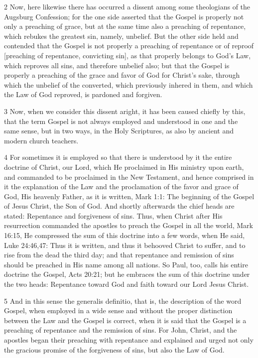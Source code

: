 2 Now, here likewise there has occurred a dissent among some theologians of the Augsburg Confession; for the one side asserted that the Gospel is properly not only a preaching of grace, but at the same time also a preaching of repentance, which rebukes the greatest sin, namely, unbelief. But the other side held and contended that the Gospel is not properly a preaching of repentance or of reproof [preaching of repentance, convicting sin], as that properly belongs to God’s Law, which reproves all sins, and therefore unbelief also; but that the Gospel is properly a preaching of the grace and favor of God for Christ’s sake, through which the unbelief of the converted, which previously inhered in them, and which the Law of God reproved, is pardoned and forgiven.

3 Now, when we consider this dissent aright, it has been caused chiefly by this, that the term Gospel is not always employed and understood in one and the same sense, but in two ways, in the Holy Scriptures, as also by ancient and modern church teachers.

4 For sometimes it is employed so that there is understood by it the entire doctrine of Christ, our Lord, which He proclaimed in His ministry upon earth, and commanded to be proclaimed in the New Testament, and hence comprised in it the explanation of the Law and the proclamation of the favor and grace of God, His heavenly Father, as it is written, Mark 1:1: The beginning of the Gospel of Jesus Christ, the Son of God. And shortly afterwards the chief heads are stated: Repentance and forgiveness of sins. Thus, when Christ after His resurrection commanded the apostles to preach the Gospel in all the world, Mark 16:15, He compressed the sum of this doctrine into a few words, when He said, Luke 24:46,47: Thus it is written, and thus it behooved Christ to suffer, and to rise from the dead the third day; and that repentance and remission of sins should be preached in His name among all nations. So Paul, too, calls his entire doctrine the Gospel, Acts 20:21; but he embraces the sum of this doctrine under the two heads: Repentance toward God and faith toward our Lord Jesus Christ.

5 And in this sense the generalis definitio, that is, the description of the word Gospel, when employed in a wide sense and without the proper distinction between the Law and the Gospel is correct, when it is said that the Gospel is a preaching of repentance and the remission of sins. For John, Christ, and the apostles began their preaching with repentance and explained and urged not only the gracious promise of the forgiveness of sins, but also the Law of God.

